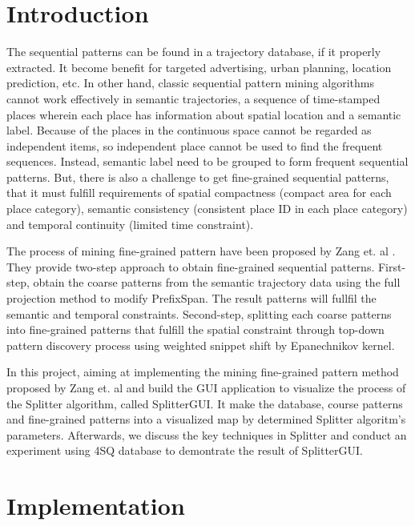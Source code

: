 \documentclass[conference]{IEEEtran}
\begin{document}
\section{Introduction}
The sequential patterns can be found in a trajectory database, if it properly extracted. It become benefit for targeted advertising, urban planning, location prediction, etc. In other hand, classic sequential pattern mining algorithms cannot work effectively in semantic trajectories, a sequence of time-stamped places wherein each place has information about spatial location and a semantic label. Because of the places in the continuous space cannot be regarded as independent items, so independent place cannot be used to find the frequent sequences. Instead, semantic label need to be grouped to form frequent sequential patterns. But, there is also a challenge to get fine-grained sequential patterns, that it must fulfill requirements of spatial compactness (compact area for each place category), semantic consistency (consistent place ID in each place category) and temporal continuity (limited time constraint).
\par
The process of mining fine-grained pattern have been proposed by Zang et. al \cite{zhang2014splitter}. They provide two-step approach to obtain fine-grained sequential patterns. First-step, obtain the coarse patterns from the semantic trajectory data using the full projection method to modify PrefixSpan. The result patterns will fullfil the semantic and temporal constraints. Second-step, splitting each coarse patterns into fine-grained patterns that fulfill the spatial constraint through top-down pattern discovery process using weighted snippet shift by Epanechnikov kernel.
\par
In this project, aiming at implementing the mining fine-grained pattern method proposed by Zang et. al \cite{zhang2014splitter} and build the GUI application to visualize the process of the Splitter algorithm, called SplitterGUI. It make the database, course patterns and fine-grained patterns into a visualized map by determined Splitter algoritm's parameters. Afterwards, we discuss the key techniques in Splitter and conduct an experiment using 4SQ database to demontrate the result of SplitterGUI.


\section{Implementation}
\end{document}
